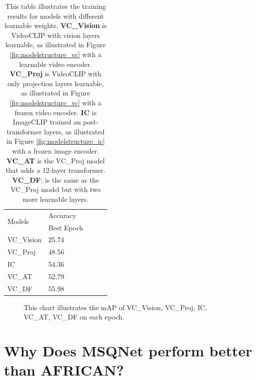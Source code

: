 \begin{table}[ht]
    \centering
    \caption[Training Results for Models with Different Learnable Weights] {This table illustrates the training results for models with different learnable weights. \textbf{VC\_Vision} is VideoCLIP with vision layers learnable, as illustrated in Figure \ref{fig:modelstructure_vc} with a learnable video encoder. \textbf{VC\_Proj} is VideoCLIP with only projection layers learnable, as illustrated in Figure \ref{fig:modelstructure_vc} with a frozen video encoder. \textbf{IC} is ImageCLIP trained on post-transformer layers, as illustrated in Figure \ref{fig:modelstructure_ic} with a frozen image encoder. \textbf{VC\_AT} is the VC\_Proj model that adds a 12-layer transformer. \textbf{VC\_DF}: is the same as the VC\_Proj model but with two more learnable layers.}
    \label{tab:ablation_vc}
    \begin{tabular}{lllll}
        \toprule
        \multirow{2}{*}{Models} & Accuracy \\
        \cmidrule{2-2} 
        {} &  Best Epoch \\
        \midrule
        VC\_Vision & 25.74 \\
        VC\_Proj   & 48.56 \\
        IC         & 54.36 \\
        VC\_AT     & 52.79 \\
        VC\_DF     & 55.98 \\
        \bottomrule
    \end{tabular}
\end{table}

\begin{figure}[ht]
    \centering
    \resizebox{0.8\textwidth}{!}{}
    \caption[mAP of VC\_Vision, VC\_Proj, IC, VC\_AT, VC\_DF on each Epoch]{This chart illustrates the mAP of VC\_Vision, VC\_Proj, IC, VC\_AT, VC\_DF on each epoch.}
    \label{fig:ablation_vc}
\end{figure}

\section{Why Does MSQNet perform better than AFRICAN?}
\label{sec:discussion_msqnet}

